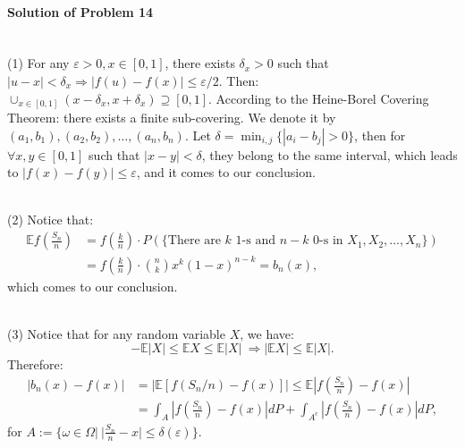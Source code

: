 \documentclass{article}
\begin{document}
\paragraph{Solution of Problem 14} ~\\
(1) For any $\varepsilon > 0, x\in[0,1]$, there exists $\delta_x>0$ such that $|u-x|< \delta_x\Rightarrow |f(u)-f(x)|\leqslant \varepsilon/2$. Then: $\cup_{x\in[0,1]}(x-\delta_x, x+\delta_x)\supseteq[0,1]$. According to the Heine-Borel Covering Theorem: there exists a finite sub-covering. We denote it by $(a_1, b_1), (a_2, b_2), \ldots, (a_n, b_n)$.  Let $\delta = \min_{i,j}\{|a_i-b_j|>0\}$, then for $\forall x,y\in[0,1]$ such that $|x-y|<\delta$, they belong to the same interval, which leads to $|f(x)-f(y)|\leqslant \varepsilon$, and it comes to our conclusion. 

~\\
(2) Notice that:
\begin{equation*}
\begin{aligned}
\mathbb{E}f\left(\frac{S_n}{n}\right) &= f\left(\frac{k}{n}\right)\cdot P(\{\text{There are }k\text{ 1-s and }n-k\text{ 0-s in }X_1, X_2, \ldots, X_n\})\\
&= f\left(\frac{k}{n}\right)\cdot\binom{n}{k}x^k(1-x)^{n-k}=b_n(x),
\end{aligned}    
\end{equation*}
which comes to our conclusion. 

~\\
(3) Notice that for any random variable $X$, we have:
\[-\mathbb{E}|X|\leqslant \mathbb{E}X \leqslant \mathbb{E}|X|~\Rightarrow |\mathbb{E}X|\leqslant \mathbb{E}|X|.\]
Therefore:
\begin{equation*}
\begin{aligned}
|b_n(x)-f(x)| &= |\mathbb{E}[f(S_n/n)-f(x)]|\leqslant \mathbb{E}\left|f\left(\frac{S_n}{n}\right)-f(x)\right|\\
&= \int_A\left|f\left(\frac{S_n}{n}\right)-f(x)\right|dP + \int_{A^c}\left|f\left(\frac{S_n}{n}\right)-f(x)\right|dP,
\end{aligned}
\end{equation*}
for $A:=\{\omega\in\Omega|~|\frac{S_n}{n}-x|\leqslant \delta(\varepsilon)\}.$
\end{document}
